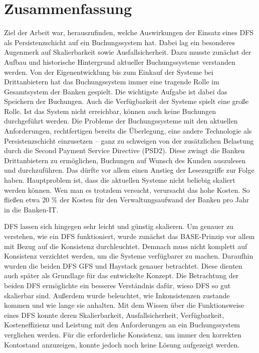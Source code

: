 \documentclass[12pt,oneside,a4paper,parskip]{scrbook}
\begin{document}
\chapter{Zusammenfassung}
Ziel der Arbeit war, herauszufinden, welche Auswirkungen der Einsatz eines DFS als Persistenzschicht auf ein Buchungssystem hat. Dabei lag ein besonderes Augenmerk auf Skalierbarkeit sowie Ausfallsicherheit. Dazu musste zunächst der Aufbau und historische Hintergrund aktueller Buchungssysteme verstanden werden. Von der Eigenentwicklung bis zum Einkauf der Systeme bei Drittanbietern hat das Buchungssystem immer eine tragende Rolle im Gesamtsystem der Banken gespielt. Die wichtigste Aufgabe ist dabei das Speichern der Buchungen. Auch die Verfügbarkeit der Systeme spielt eine große Rolle. Ist das System nicht erreichbar, können auch keine Buchungen durchgeführt werden. Die Probleme der Buchungssysteme mit den aktuellen Anforderungen, rechtfertigen bereits die Überlegung, eine andere Technologie als Persistenzschicht einzusetzen – ganz zu schweigen von der zusätzlichen Belastung durch die Second Payment Service Directive (PSD2). Diese zwingt die Banken Drittanbietern zu ermöglichen, Buchungen auf Wunsch des Kunden auszulesen und durchzuführen. Das dürfte vor allem einen Anstieg der Lesezugriffe zur Folge haben. Hauptproblem ist, dass die aktuellen Systeme nicht beliebig skaliert werden können. Wen man es trotzdem versucht, verursacht das hohe Kosten. So fließen etwa 20 \% der Kosten für den Verwaltungsaufwand der Banken pro Jahr in die Banken-IT. 

DFS lassen sich hingegen sehr leicht und günstig skalieren. Um genauer zu verstehen, wie ein DFS funktioniert, wurde zunächst das BASE-Prinzip vor allem mit Bezug auf die Konsistenz durchleuchtet. Demnach muss nicht komplett auf Konsistenz verzichtet werden, um die Systeme verfügbarer zu machen. Daraufhin wurden die beiden DFS GFS und Haystack genauer betrachtet. Diese dienten auch später als Grundlage für das entwickelte Konzept. Die Betrachtung der beiden DFS ermöglichte ein besseres Verständnis dafür, wieso DFS so gut skalierbar sind. Außerdem wurde beleuchtet, wie Inkonsistenzen zustande kommen und wie lange sie anhalten. Mit dem Wissen über die Funktionsweise eines DFS konnte deren Skalierbarkeit, Ausfallsicherheit, Verfügbarkeit, Kosteneffizienz und Leistung mit den Anforderungen an ein Buchungssystem verglichen werden. Für die erforderliche Konsistenz, um immer den korrekten Kontostand anzuzeigen, konnte jedoch noch keine Lösung aufgezeigt werden.
\end{document}
